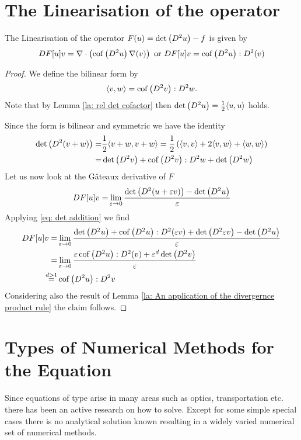 \section{The Linearisation of the \MA operator}
	\begin{theorem}[Linearisation] \label{thm: linearisation}
		The Linearisation of the \MA operator $F(u)=\det{\left(D^2u\right)}-f$ is given by
		\begin{align}
			DF[u]v = \nabla \cdot \left( \operatorname{cof} \left( D^2 u  \right) \nabla (v) \right) \text{ or } DF[u]v=\operatorname{cof} \left( D^2 u \right):D^2 (v)		\end{align}
	\end{theorem}
	
	\begin{proof}
	We define the \MA bilinear form by
	\[
	 \langle v, w \rangle = \operatorname{cof} \left( D^2 v \right):D^2w.
	\]
	Note that by Lemma \ref{la: rel det cofactor} then $\det{\left(D^2 u\right)} = \frac 1 2  \langle u, u \rangle$ holds.
	
	Since the \MA form is bilinear and symmetric we have the identity
	\begin{align}
		\det{\left(D^2 (v+w)\right)} =& \frac 1 2  \langle v+w, v+w \rangle = \frac 1 2 \left( \langle v, v \rangle + 2  \langle v, w \rangle +  \langle w, w \rangle \right)  \\
		=&  \det{\left(D^2 v\right)}  + \operatorname{cof} \left( D^2 v \right) : D^2 w + \det{\left(D^2 w\right)} \label{eq: det addition}
	\end{align}
	 Let us now look at the G\^ateaux derivative of $F$
		\begin{align*}
			DF[u]v =& \lim\limits_{\varepsilon \rightarrow 0} \frac { \det{\left(D^2(u+\varepsilon v)\right)} - \det{\left(D^2u\right)}}\varepsilon\\
			\end{align*}
Applying \eqref{eq: det addition} we find
		\begin{align*}
			DF[u]v =& \lim\limits_{\varepsilon \rightarrow 0} 
										\frac  {\det{\left(D^2 u\right)} + \operatorname{cof} \left( D^2 u \right) : D^2(\varepsilon v) + \det{\left(D^2 \varepsilon v\right)} - \det{\left(D^2 u\right)}}
													\varepsilon\\ 
			 =& \lim\limits_{\varepsilon \rightarrow 0} 
										\frac  {\varepsilon \operatorname{cof} \left( D^2 u \right) : D^2(v) + \varepsilon^d \det{\left(D^2 v\right)}}
													\varepsilon\\ 
			\stackrel{d > 1} =& \operatorname{cof} \left( D^2 u \right):D^2v
		\end{align*}
Considering also the result of Lemma \ref{la: An application of the divergernce product rule} the claim follows.
	\end{proof}	


\section{Types of Numerical Methods for the \MA Equation}
Since equations of \MA type arise in many areas such as optics, transportation etc. there has been an active research on how to solve. Except for some simple special cases there is no analytical solution known resulting in a widely varied numerical set of numerical methods.

